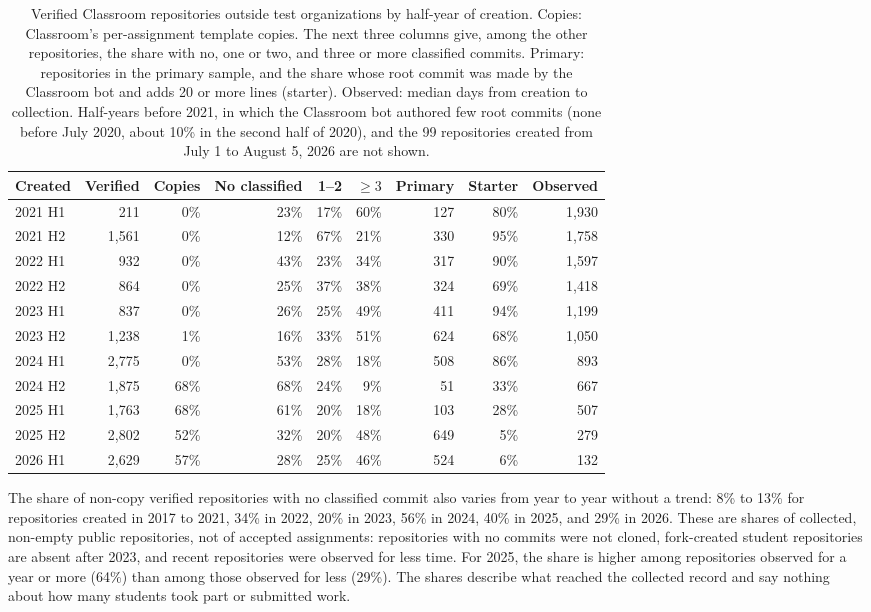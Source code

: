 \documentclass[acmsmall,screen,review,anonymous]{acmart}
\begin{document}
\begin{table}
\caption{Verified Classroom repositories outside test organizations by half-year of creation. Copies: Classroom's per-assignment template copies. The next three columns give, among the other repositories, the share with no, one or two, and three or more classified commits. Primary: repositories in the primary sample, and the share whose root commit was made by the Classroom bot and adds 20 or more lines (starter). Observed: median days from creation to collection. Half-years before 2021, in which the Classroom bot authored few root commits (none before July 2020, about 10\% in the second half of 2020), and the 99 repositories created from July 1 to August 5, 2026 are not shown.}
\label{tab:recordgen}
\footnotesize
\setlength{\tabcolsep}{4pt}
\begin{tabular}{@{}l r r r r r r r r@{}}
\toprule
Created & Verified & Copies & No classified & 1--2 & $\geq 3$ & Primary & Starter & Observed \\
\midrule
2021 H1 & 211 & 0\% & 23\% & 17\% & 60\% & 127 & 80\% & 1,930 \\
2021 H2 & 1,561 & 0\% & 12\% & 67\% & 21\% & 330 & 95\% & 1,758 \\
2022 H1 & 932 & 0\% & 43\% & 23\% & 34\% & 317 & 90\% & 1,597 \\
2022 H2 & 864 & 0\% & 25\% & 37\% & 38\% & 324 & 69\% & 1,418 \\
2023 H1 & 837 & 0\% & 26\% & 25\% & 49\% & 411 & 94\% & 1,199 \\
2023 H2 & 1,238 & 1\% & 16\% & 33\% & 51\% & 624 & 68\% & 1,050 \\
2024 H1 & 2,775 & 0\% & 53\% & 28\% & 18\% & 508 & 86\% & 893 \\
2024 H2 & 1,875 & 68\% & 68\% & 24\% & 9\% & 51 & 33\% & 667 \\
2025 H1 & 1,763 & 68\% & 61\% & 20\% & 18\% & 103 & 28\% & 507 \\
2025 H2 & 2,802 & 52\% & 32\% & 20\% & 48\% & 649 & 5\% & 279 \\
2026 H1 & 2,629 & 57\% & 28\% & 25\% & 46\% & 524 & 6\% & 132 \\
\bottomrule
\end{tabular}
\end{table}

The share of non-copy verified repositories with no classified commit also varies from year to year without a trend: 8\% to 13\% for repositories created in 2017 to 2021, 34\% in 2022, 20\% in 2023, 56\% in 2024, 40\% in 2025, and 29\% in 2026. These are shares of collected, non-empty public repositories, not of accepted assignments: repositories with no commits were not cloned, fork-created student repositories are absent after 2023, and recent repositories were observed for less time. For 2025, the share is higher among repositories observed for a year or more (64\%) than among those observed for less (29\%). The shares describe what reached the collected record and say nothing about how many students took part or submitted work.
\end{document}
